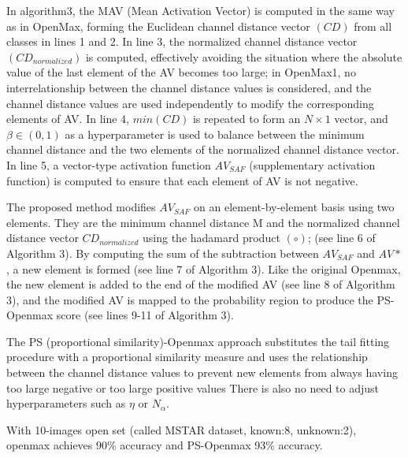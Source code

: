 \documentclass[dvipdfmx]{article}
\begin{document}
In algorithm3, the MAV (Mean Activation Vector) is computed in the same way as in OpenMax, forming the Euclidean channel distance vector $(CD)$ from all classes in lines 1 and 2.
In line 3, the normalized channel distance vector $(CD_{normalized})$ is computed, effectively avoiding the situation where the absolute value of the last element of the AV becomes too large; in OpenMax1, no interrelationship between the channel distance values is considered, and the channel distance values are used independently to modify the corresponding elements of AV.
In line 4, $min(CD)$ is repeated to form an $N \times 1$ vector, and $\beta \in (0,1)$ as a hyperparameter is used to balance between the minimum channel distance and the two elements of the normalized channel distance vector.
In line 5, a vector-type activation function $AV_{SAF}$ (supplementary activation function) is computed to ensure that each element of AV is not negative.

The proposed method modifies $AV_{SAF}$ on an element-by-element basis using two elements. They are the minimum channel distance M and the normalized channel distance vector $CD_{normalized}$ using the hadamard product $(\circ)$; (see line 6 of Algorithm 3).
By computing the sum of the subtraction between $AV_{SAF}$ and $AV*$ , a new element is formed (see line 7 of Algorithm 3). Like the original Openmax, the new element is added to the end of the modified AV (see line 8 of Algorithm 3), and the modified AV is mapped to the probability region to produce the PS-Openmax score (see lines 9-11 of Algorithm 3).

The PS (proportional similarity)-Openmax approach substitutes the tail fitting procedure with a proportional similarity measure and uses the relationship between the channel distance values to prevent new elements from always having too large negative or too large positive values There is also no need to adjust hyperparameters such as $\eta$ or $N_{\alpha}$.


With 10-images open set (called MSTAR dataset, known:8, unknown:2), openmax achieves 90\% accuracy and PS-Openmax 93\% accuracy. 
\end{document}
